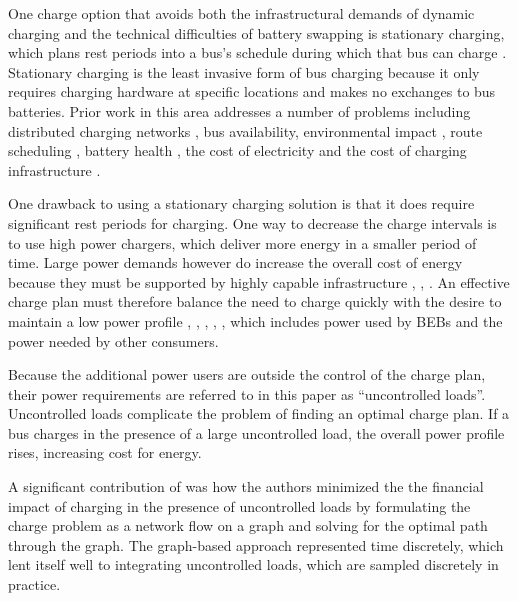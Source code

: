 \par One charge option that avoids both the infrastructural demands of dynamic charging and the technical difficulties of battery swapping is stationary charging, which plans rest periods into a bus's schedule during which that bus can charge \cite{whitaker_network_nodate}. Stationary charging is the least invasive form of bus charging because it only requires charging hardware at specific locations and makes no exchanges to bus batteries. Prior work in this area addresses a number of problems including distributed charging networks \cite{Nimalsiri2020}, bus availability, environmental impact \cite{zhou_bi-objective_2021}, route scheduling \cite{Rinalde_Mixed_2020}, battery health \cite{houbbadi_optimal_2019}, the cost of electricity \cite{Leou_optimal_2017} and the cost of charging infrastructure \cite{Wei2018}.
\par One drawback to using a stationary charging solution is that it does require significant rest periods for charging. One way to decrease the charge intervals is to use high power chargers, which deliver more energy in a smaller period of time. Large power demands however do increase the overall cost of energy because they must be supported by highly capable infrastructure \cite{stahleder_impact_2019}, \cite{deb_impact_2017}, \cite{boonraksa_impact_2019}. An effective charge plan must therefore balance the need to charge quickly with the desire to maintain a low power profile \cite{cheng_smart_2020}, \cite{ojer_development_2020}, \cite{qin_numerical_2016}, \cite{bagherinezhad_spatio-temporal_2020}, \cite{Wang2019}, \cite{He_2019_Fast} which includes power used by BEBs and the power needed by other consumers.  
\par Because the additional power users are outside the control of the charge plan, their power requirements are referred to in this paper as ``uncontrolled loads''. Uncontrolled loads complicate the problem of finding an optimal charge plan. If a bus charges in the presence of a large uncontrolled load, the overall power profile rises, increasing cost for energy. 
\par A significant contribution of \cite{mortensen_comprehensive_2021} was how the authors minimized the the financial impact of charging in the presence of uncontrolled loads by formulating the charge problem as a network flow on a graph and solving for the optimal path through the graph. The graph-based approach represented time discretely, which lent itself well to integrating uncontrolled loads, which are sampled discretely in practice. 
